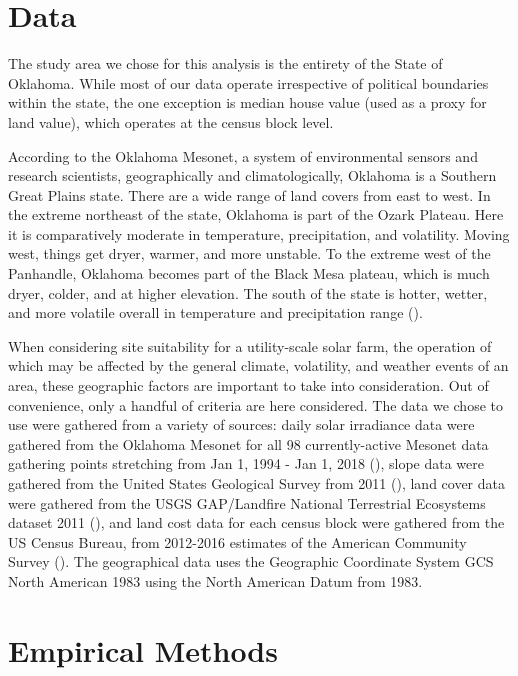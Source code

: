 \documentclass[12pt,english]{article}
\begin{document}
\pagebreak{}


\section{Data}\label{sec:data}

The study area we chose for this analysis is the entirety of the State of Oklahoma. While most of our data operate irrespective of political boundaries within the state, the one exception is median house value (used as a proxy for land value), which operates at the census block level.  

According to the Oklahoma Mesonet, a system of environmental sensors and research scientists, geographically and climatologically, Oklahoma is a Southern Great Plains state. There are a wide range of land covers from east to west. In the extreme northeast of the state, Oklahoma is part of the Ozark Plateau. Here it is comparatively moderate in temperature, precipitation, and volatility. Moving west, things get dryer, warmer, and more unstable. To the extreme west of the Panhandle, Oklahoma becomes part of the Black Mesa plateau, which is much dryer, colder, and at higher elevation. The south of the state is hotter, wetter, and more volatile overall in temperature and precipitation range (\citet{arndt}).  

When considering site suitability for a utility-scale solar farm, the operation of which may be affected by the general climate, volatility, and weather events of an area, these geographic factors are important to take into consideration. Out of convenience, only a handful of criteria are here considered. The data we chose to use were gathered from a variety of sources: daily solar irradiance data were gathered from the Oklahoma Mesonet for all 98 currently-active Mesonet data gathering points stretching from Jan 1, 1994 - Jan 1, 2018 (\citet{mesonet}), slope data were gathered from the United States Geological Survey from 2011 (\citet{ned}), land cover data were gathered from the USGS GAP/Landfire National Terrestrial Ecosystems dataset 2011 (\citet{landcover}), and land cost data for each census block were gathered from the US Census Bureau, from 2012-2016 estimates of the American Community Survey (\citet{census}). The geographical data uses the Geographic Coordinate System GCS North American 1983 using the North American Datum from 1983.  

\pagebreak{}

\section{Empirical Methods}\label{sec:methods}
\end{document}
